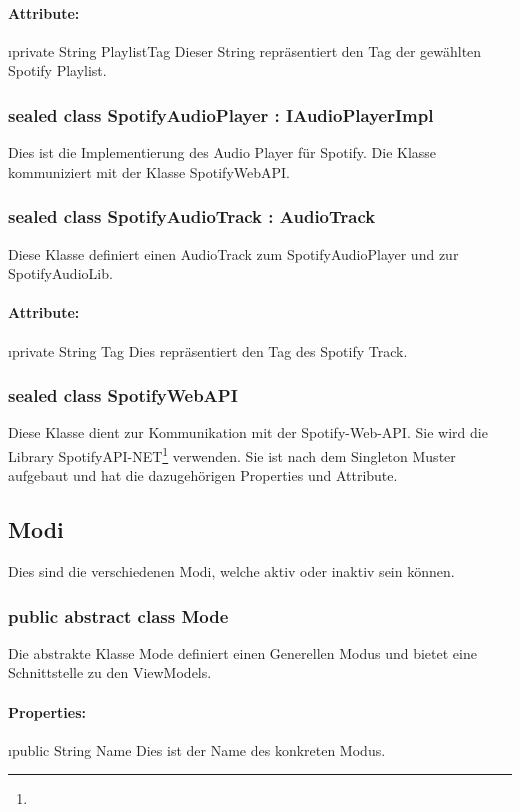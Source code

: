 \documentclass[../entwurf.tex]{subfiles}
\begin{document}
				\paragraph{Attribute:}
					\begin{itemize}
						\i{private String PlaylistTag} Dieser String repräsentiert den Tag der gewählten Spotify Playlist.
					\end{itemize}
			\subsubsection{sealed class SpotifyAudioPlayer : IAudioPlayerImpl}
				Dies ist die Implementierung des Audio Player für Spotify. Die Klasse kommuniziert mit der Klasse SpotifyWebAPI.
			\subsubsection{sealed class SpotifyAudioTrack : AudioTrack}
				Diese Klasse definiert einen AudioTrack zum SpotifyAudioPlayer und zur SpotifyAudioLib.
				\paragraph{Attribute:}
					\begin{itemize}
						\i{private String Tag} Dies repräsentiert den Tag des Spotify Track.
					\end{itemize}
			\subsubsection{sealed class SpotifyWebAPI}
				Diese Klasse dient zur Kommunikation mit der Spotify-Web-API. Sie wird die Library
				SpotifyAPI-NET\footnote{} verwenden.
				Sie ist nach dem Singleton Muster aufgebaut und hat die dazugehörigen Properties und Attribute.
		\subsection{Modi}
			Dies sind die verschiedenen Modi, welche aktiv oder inaktiv sein können.
			\subsubsection{public abstract class Mode}
				Die abstrakte Klasse Mode definiert einen Generellen Modus und bietet eine Schnittstelle zu den ViewModels.
				\paragraph{Properties:}
					\begin{itemize}
						\i{public String Name} Dies ist der Name des konkreten Modus.
					\end{itemize}
\end{document}
